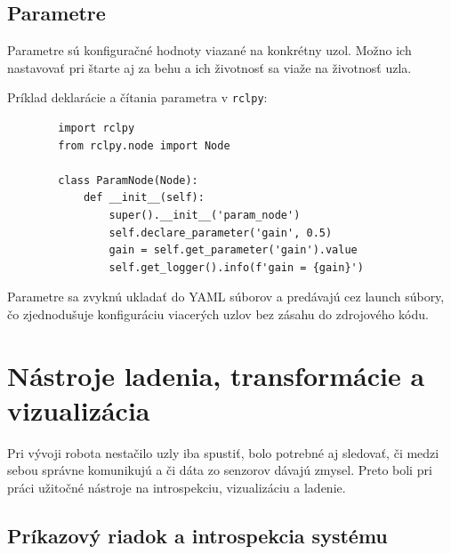         \subsection*{Parametre}
      
        Parametre sú konfiguračné hodnoty viazané na konkrétny uzol. Možno ich nastavovať pri štarte aj za behu a ich životnosť sa viaže na životnosť uzla.
      
        Príklad deklarácie a čítania parametra v \texttt{rclpy}:
      
        \begin{verbatim}
        import rclpy
        from rclpy.node import Node
      
        class ParamNode(Node):
            def __init__(self):
                super().__init__('param_node')
                self.declare_parameter('gain', 0.5)
                gain = self.get_parameter('gain').value
                self.get_logger().info(f'gain = {gain}')
        \end{verbatim}
      
        Parametre sa zvyknú ukladať do YAML súborov a predávajú cez launch súbory, čo zjednodušuje konfiguráciu viacerých uzlov bez zásahu do zdrojového kódu.
      
        \section{Nástroje ladenia, transformácie a vizualizácia}
      
        Pri vývoji robota nestačilo uzly iba spustiť, bolo potrebné aj sledovať, či medzi sebou správne komunikujú a či dáta zo senzorov dávajú zmysel. Preto boli pri práci užitočné nástroje na introspekciu, vizualizáciu a ladenie.
      
        \subsection*{Príkazový riadok a introspekcia systému}
      
